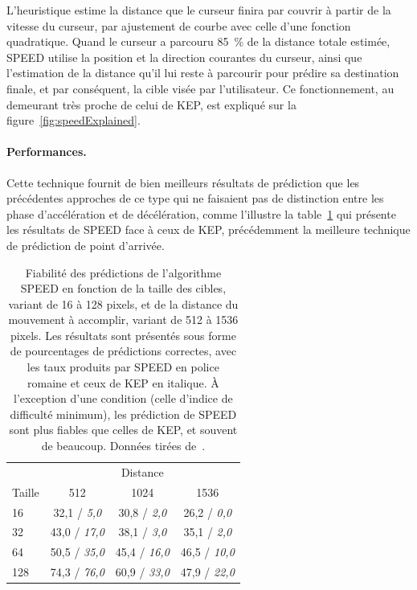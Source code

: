 	L'heuristique estime la distance que le curseur finira par couvrir à partir de la vitesse du curseur, par ajustement de courbe avec celle d'une fonction quadratique. Quand le curseur a parcouru 85~\%{} de la distance totale estimée, SPEED utilise la position et la direction courantes du curseur, ainsi que l'estimation de la distance qu'il lui reste à parcourir pour prédire sa destination finale, et par conséquent, la cible visée par l'utilisateur. Ce fonctionnement, au demeurant très proche de celui de KEP, est expliqué sur la figure~\ref{fig:speedExplained}.
	
	\paragraph{Performances.}
	Cette technique fournit de bien meilleurs résultats de prédiction que les précédentes approches de ce type qui ne faisaient pas de distinction entre les phase d'accélération et de décélération, comme l'illustre la table~\ref{tab:speedingPastKep} qui présente les résultats de SPEED face à ceux de KEP, précédemment la meilleure technique de prédiction de point d'arrivée.
	
	\begin{table}
	\centering
	\begin{tabular}{l | c c c}
				& \multicolumn{3}{c}{Distance}	\\
		Taille	& 512					& 1024					& 1536					\bigstrut[b] \\ \hline
		16		& 32,1 / \emph{5,0}		& 30,8 / \emph{2,0}		& 26,2 / \emph{0,0}		\bigstrut[t] \\
		32		& 43,0 / \emph{17,0}	& 38,1 / \emph{3,0}		& 35,1 / \emph{2,0}		\\
		64		& 50,5 / \emph{35,0}	& 45,4 / \emph{16,0}	& 46,5 / \emph{10,0}	\\
		128		& 74,3 / \emph{76,0}	& 60,9 / \emph{33,0}	& 47,9 / \emph{22,0}	\\
	\end{tabular}
	\caption[SPEED -- performances comparées à celles de KEP]{Fiabilité des prédictions de l'algorithme SPEED en fonction de la taille des cibles, variant de 16 à 128 pixels, et de la distance du mouvement à accomplir, variant de 512 à 1536 pixels. Les résultats sont présentés sous forme de pourcentages de prédictions correctes, avec les taux produits par SPEED en police romaine et ceux de KEP en italique. À l'exception d'une condition (celle d'indice de difficulté minimum), les prédiction de SPEED sont plus fiables que celles de KEP, et souvent de beaucoup. Données tirées de~\cite{wonner2011speed}.}
	\label{tab:speedingPastKep}
	\end{table}
	
